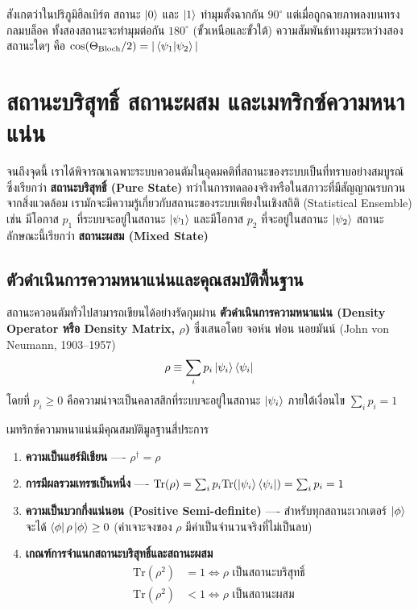 สังเกตว่าในปริภูมิฮิลเบิร์ต สถานะ $\ket{0}$ และ $\ket{1}$ ทำมุมตั้งฉากกัน $90^\circ$ แต่เมื่อถูกฉายภาพลงบนทรงกลมบล็อค ทั้งสองสถานะจะทำมุมต่อกัน $180^\circ$ (ขั้วเหนือและขั้วใต้) ความสัมพันธ์ทางมุมระหว่างสองสถานะใดๆ คือ $\cos(\Theta_{\text{Bloch}}/2) = |\braket{\psi_1}{\psi_2}|$

\section{สถานะบริสุทธิ์ สถานะผสม และเมทริกซ์ความหนาแน่น}

จนถึงจุดนี้ เราได้พิจารณาเฉพาะระบบควอนตัมในอุดมคติที่สถานะของระบบเป็นที่ทราบอย่างสมบูรณ์ ซึ่งเรียกว่า \textbf{สถานะบริสุทธิ์ (Pure State)} ทว่าในการทดลองจริงหรือในสภาวะที่มีสัญญาณรบกวนจากสิ่งแวดล้อม เรามักจะมีความรู้เกี่ยวกับสถานะของระบบเพียงในเชิงสถิติ (Statistical Ensemble) เช่น มีโอกาส $p_1$ ที่ระบบจะอยู่ในสถานะ $\ket{\psi_1}$ และมีโอกาส $p_2$ ที่จะอยู่ในสถานะ $\ket{\psi_2}$ สถานะลักษณะนี้เรียกว่า \textbf{สถานะผสม (Mixed State)}

\subsection{ตัวดำเนินการความหนาแน่นและคุณสมบัติพื้นฐาน}
สถานะควอนตัมทั่วไปสามารถเขียนได้อย่างรัดกุมผ่าน \textbf{ตัวดำเนินการความหนาแน่น (Density Operator หรือ Density Matrix, $\rho$)} ซึ่งเสนอโดย จอห์น ฟอน นอยมันน์ (John von Neumann, 1903--1957)
\begin{equation}
\rho \equiv \sum_i p_i \ket{\psi_i}\bra{\psi_i}
\label{eq:density_matrix_def}
\end{equation}
โดยที่ $p_i \ge 0$ คือความน่าจะเป็นคลาสสิกที่ระบบจะอยู่ในสถานะ $\ket{\psi_i}$ ภายใต้เงื่อนไข $\sum_i p_i = 1$

เมทริกซ์ความหนาแน่นมีคุณสมบัติมูลฐานสี่ประการ
\begin{enumerate}
    \item \textbf{ความเป็นแฮร์มิเชียน} ---- $\rho^\dagger = \rho$
    \item \textbf{การมีผลรวมเทรซเป็นหนึ่ง} ---- $\text{Tr}(\rho) = \sum_i p_i \text{Tr}(\ket{\psi_i}\bra{\psi_i}) = \sum_i p_i = 1$
    \item \textbf{ความเป็นบวกกึ่งแน่นอน (Positive Semi-definite)} ---- สำหรับทุกสถานะเวกเตอร์ $\ket{\phi}$ จะได้ $\bra{\phi}\rho\ket{\phi} \ge 0$ (ค่าเจาะจงของ $\rho$ มีค่าเป็นจำนวนจริงที่ไม่เป็นลบ)
    \item \textbf{เกณฑ์การจำแนกสถานะบริสุทธิ์และสถานะผสม}
    \begin{align}
    \text{Tr}(\rho^2) &= 1 \iff \rho \text{ เป็นสถานะบริสุทธิ์} \\
    \text{Tr}(\rho^2) &< 1 \iff \rho \text{ เป็นสถานะผสม}
    \end{align}
\end{enumerate}

